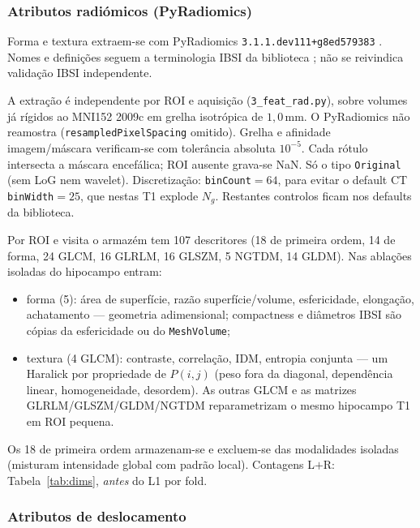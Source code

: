 \documentclass[review]{elsarticle}
\newcommand{\code}[1]{\texttt{#1}}
\begin{document}
	\subsubsection{Atributos radiómicos (PyRadiomics)}\label{sec:radiomics}
	
	Forma e textura extraem-se com PyRadiomics \code{3.1.1.dev111+g8ed579383} \cite{griethuysen-2017}.
	Nomes e definições seguem a terminologia IBSI da biblioteca \cite{zwanenburg-2020}; não se reivindica validação IBSI independente.
	
	A extração é independente por ROI e aquisição (\code{3\_feat\_rad.py}), sobre volumes já rígidos ao MNI152 2009c em grelha isotrópica de $1{,}0$\,mm.
	O PyRadiomics não reamostra (\code{resampledPixelSpacing} omitido).
	Grelha e afinidade imagem/máscara verificam-se com tolerância absoluta \(10^{-5}\).
	Cada rótulo intersecta a máscara encefálica; ROI ausente grava-se NaN.
	Só o tipo \code{Original} (sem LoG nem wavelet).
	Discretização: \code{binCount}$=64$, para evitar o default CT \code{binWidth}$=25$, que nestas T1 explode $N_g$.
	Restantes controlos ficam nos defaults da biblioteca.
	
	Por ROI e visita o armazém tem 107 descritores (18 de primeira ordem, 14 de forma, 24 GLCM, 16 GLRLM, 16 GLSZM, 5 NGTDM, 14 GLDM).
	Nas ablações isoladas do hipocampo entram:
	\begin{itemize}
		\item forma (5): área de superfície, razão superfície/volume, esfericidade, elongação, achatamento --- geometria adimensional; compactness e diâmetros IBSI são cópias da esfericidade ou do \code{MeshVolume};
		\item textura (4 GLCM): contraste, correlação, IDM, entropia conjunta --- um Haralick por propriedade de $P(i,j)$ (peso fora da diagonal, dependência linear, homogeneidade, desordem). As outras GLCM e as matrizes GLRLM/GLSZM/GLDM/NGTDM reparametrizam o mesmo hipocampo T1 em ROI pequena.
	\end{itemize}
	Os 18 de primeira ordem armazenam-se e excluem-se das modalidades isoladas (misturam intensidade global com padrão local).
	Contagens L$+$R: Tabela~\ref{tab:dims}, \emph{antes} do L1 por fold.
	
	\subsubsection{Atributos de deslocamento}\label{sec:displacement-features}
	
\end{document}
